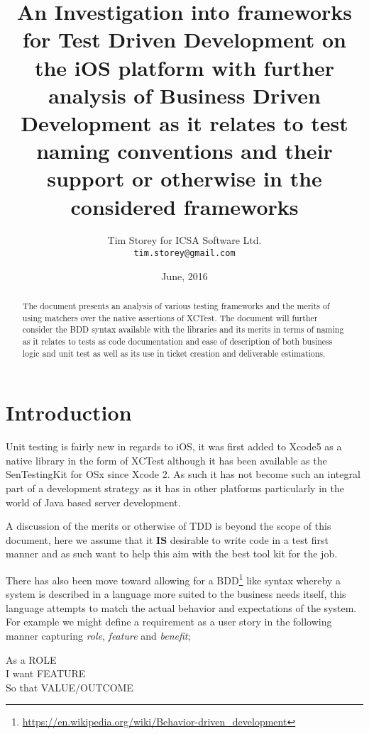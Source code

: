 \documentclass[a4paper, titlepage]{article}
\title{An Investigation into frameworks for Test Driven
Development on the iOS platform with further
analysis of Business Driven Development as it relates to test naming
conventions and their support or otherwise in the considered frameworks}
\author{Tim Storey \hfill for \hfill ICSA Software Ltd.
        \\\texttt{tim.storey@gmail.com}}
\date{June, 2016}
\begin{document}
\maketitle

\begin{abstract}
  The document presents an analysis of various testing frameworks
  and the merits of using matchers over the native assertions of
  XCTest. The document will further consider the  BDD syntax available with the
  libraries and its merits in terms of naming as it relates to tests as code documentation
  and ease of description of both business logic and unit test as well
  as its use in ticket creation and deliverable estimations.
  \end{abstract}

\newpage

\section{Introduction}
  \label{sec:Intro}
  Unit testing is fairly new in regards to iOS, it was first added to
  Xcode5 as a native library in the form of XCTest although it has been available
  as the SenTestingKit for OSx since Xcode 2. As such it has not become such an
  integral part of a development strategy as it has in other
  platforms particularly in the world of Java based server development.

  A discussion of the merits or otherwise of TDD is beyond the scope of
  this document, here we assume that it \textbf{IS} desirable to write
  code in a test first manner and as such want to help this aim with the best
  tool kit for the job.
  
  There has also been move toward allowing for a 
  BDD\footnote{\url{https://en.wikipedia.org/wiki/Behavior-driven_development}} 
  like syntax whereby a system is
  described in a language more suited to the business needs itself, this
  language attempts to match the actual behavior and expectations of
  the system.\\For example we might define a requirement as a user
  story in the following manner capturing \textit{role},
  \textit{feature} and \textit{benefit};

  \begin{spec}{0.5}
    \ac{As a }{ROLE}\\
    \ac{I want }{FEATURE}\\
    \ac{So that }{VALUE/OUTCOME}
  \end{spec}
\end{document}
